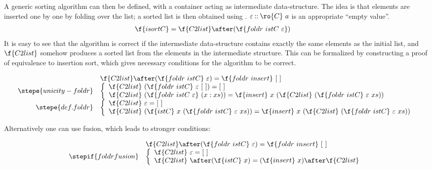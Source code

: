 \documentclass[a4paper,11pt]{llncs}
\DeclareRobustCommand\dcolon{\mathbin{::}}
\begin{document}
A generic sorting algorithm can then be defined, with a container
acting as intermediate data-structure. The idea is that elements are
inserted one by one by folding over the list; a sorted list is then
obtained using . $\varepsilon \dcolon \ro{C}\ a$ is an
appropriate ``empty value''.
\begin{align}
  \f{isortC} & = \f{C2list} \after (\f{foldr\ istC\
    \varepsilon})
\label{eq:sortRightLeft}
\end{align}
It is easy to see that the algorithm is correct if the intermediate
data-structure contains exactly the same elements as the initial list,
and $\f{C2list}$ somehow produces a sorted list from the elements in
the intermediate structure. This can be formalized by constructing a
proof of equivalence to insertion sort, which gives necessary
conditions for the algorithm to be correct.

$$
\begin{array}{rl}
& \f{C2list} \after (\f{foldr\ istC}\ \varepsilon) = \f{foldr\ insert}\ [\
  ]\\
\stepe{unicity-foldr}
& \left \{
\begin{array}{l}
\f{C2list}\ (\f{foldr\ istC}\ \varepsilon\ [\ ]) = [\ ]\\
\f{C2list}\ (\f{foldr\ istC\ \varepsilon}\ (x:xs)) = \f{insert}\ x\
(\f{C2list}\ (\f{foldr\ istC}\ \varepsilon\ xs))
\end{array}
\right .\\
\stepe{def. foldr}
& \left \{
\begin{array}{l}
\f{C2list}\ \varepsilon = [\ ]\\
\f{C2list}\ (\f{istC}\ x\ (\f{foldr\ istC}\ \varepsilon\ xs)) = \f{insert}\ x\
(\f{C2list}\ (\f{foldr\ istC}\ \varepsilon\ xs))
\end{array}
\right .
\end{array}
$$

Alternatively one can use fusion, which leads to stronger conditions:

$$
\begin{array}{rl}
& \f{C2list} \after (\f{foldr\ istC}\ \varepsilon) = \f{foldr\ insert}\ [\
  ]\\
\stepif{foldr fusion}
& \left \{
\begin{array}{l}
  \f{C2list}\ \varepsilon = [\ ]\\
  \f{C2list}\ \after (\f{istC}\ x) = (\f{insert}\ x) \after 
  \f{C2list}
\end{array}
\right .
\end{array}
$$
\end{document}
